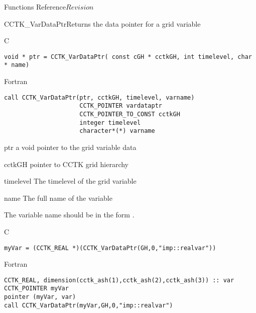 \begin{cactuspart}{ Functions Reference}{}{$Revision$}



\begin{FunctionDescription}{CCTK\_VarDataPtr}{Returns the data pointer for a grid variable}
\label{CCTK-VarDataPtr}
\begin{SynopsisSection}
\begin{Synopsis}{C}
\begin{verbatim}void * ptr = CCTK_VarDataPtr( const cGH * cctkGH, int timelevel, char * name)\end{verbatim}
\end{Synopsis}
\begin{Synopsis}{Fortran}
\begin{verbatim}
call CCTK_VarDataPtr(ptr, cctkGH, timelevel, varname)
                     CCTK_POINTER vardataptr
                     CCTK_POINTER_TO_CONST cctkGH
                     integer timelevel
                     character*(*) varname
\end{verbatim}
\end{Synopsis}
\end{SynopsisSection}
\begin{ParameterSection}
\begin{Parameter}{ptr}
a void pointer to the grid variable data
\end{Parameter}
\begin{Parameter}{cctkGH}
pointer to CCTK grid hierarchy
\end{Parameter}
\begin{Parameter}{timelevel}
The timelevel of the grid variable
\end{Parameter}
\begin{Parameter}{name}
The full name of the variable
\end{Parameter}
\end{ParameterSection}
\begin{Discussion}
The variable name should be in the form .
\end{Discussion}
\begin{ExampleSection}
\begin{Example}{C}
\begin{verbatim}
myVar = (CCTK_REAL *)(CCTK_VarDataPtr(GH,0,"imp::realvar"))
\end{verbatim}
\end{Example}
\begin{Example}{Fortran}
\begin{verbatim}
CCTK_REAL, dimension(cctk_ash(1),cctk_ash(2),cctk_ash(3)) :: var
CCTK_POINTER myVar
pointer (myVar, var)
call CCTK_VarDataPtr(myVar,GH,0,"imp::realvar")
\end{verbatim}
\end{Example}
\end{ExampleSection}
\end{FunctionDescription}


\end{cactuspart}
